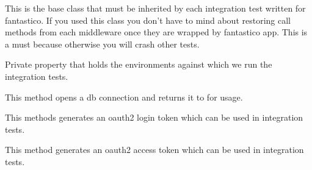 \documentclass[letterpaper,10pt,english]{sphinxmanual}
\begin{document}
\begin{fulllineitems}
\label{get_started/contribute:fantastico.tests.base_case.FantasticoIntegrationTestCase}
This is the base class that must be inherited by each integration test written for fantastico.
If you used this class you don't have to mind about restoring call methods from each middleware once they are wrapped
by fantastico app. This is a must because otherwise you will crash other tests.

\begin{fulllineitems}
\label{get_started/contribute:fantastico.tests.base_case.FantasticoIntegrationTestCase._envs}
Private property that holds the environments against which we run the integration tests.

\end{fulllineitems}


\begin{fulllineitems}
\label{get_started/contribute:fantastico.tests.base_case.FantasticoIntegrationTestCase._get_db_conn}
This method opens a db connection and returns it to for usage.

\end{fulllineitems}


\begin{fulllineitems}
\label{get_started/contribute:fantastico.tests.base_case.FantasticoIntegrationTestCase._get_oauth2_logintoken}
This methods generates an oauth2 login token which can be used in integration tests.

\end{fulllineitems}


\begin{fulllineitems}
\label{get_started/contribute:fantastico.tests.base_case.FantasticoIntegrationTestCase._get_oauth2_token}
This method generates an oauth2 access token which can be used in integration tests.


\end{fulllineitems}
\end{fulllineitems}
\end{document}
